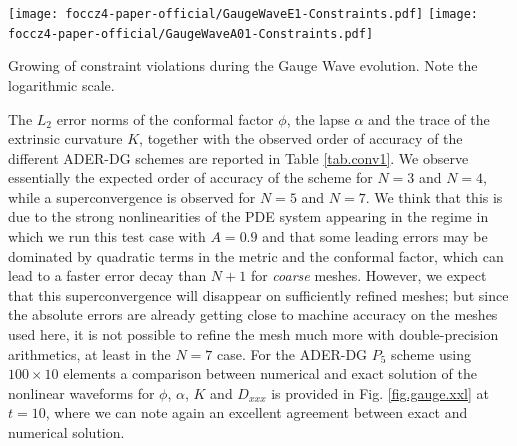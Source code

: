 \begin{marginfigure}[-6cm]
	\texttt{[image: foccz4-paper-official/GaugeWaveE1-Constraints.pdf]}
	\texttt{[image: foccz4-paper-official/GaugeWaveA01-Constraints.pdf]}
	\caption[
	GaugeWave: Constraint evolution 
	]{Growing of constraint violations during the Gauge Wave evolution.
		Note the logarithmic scale.}
	\label{fig.gaugewave2}
\end{marginfigure}

The $L_2$ error norms of the conformal factor $\phi$, the lapse $\alpha$ and
the trace of the extrinsic curvature $K$, together with the observed
order of accuracy of the different ADER-DG schemes are reported in Table
\ref{tab.conv1}. We observe essentially the expected order of accuracy of
the scheme for $N=3$ and $N=4$, while a superconvergence is observed for
$N=5$ and $N=7$. We think that this is due to the strong nonlinearities
of the PDE system appearing in the regime in which we run this test case
with $A=0.9$ and that some leading errors may be dominated by quadratic
terms in the metric and the conformal factor, which can lead to a faster
error decay than $N+1$ for \textit{coarse} meshes. However, we expect
that this superconvergence will disappear on sufficiently refined meshes;
but since the absolute errors are already getting close to machine
accuracy on the meshes used here, it is not possible to refine the mesh
much more with double-precision arithmetics, at least in the $N=7$ case.
For the ADER-DG $P_5$ scheme using $100 \times 10$ elements a comparison
between numerical and exact solution of the nonlinear waveforms for
$\phi$, $\alpha$, $K$ and $D_{xxx}$ is provided in Fig.
\ref{fig.gauge.xxl} at $t=10$, where we can note again an excellent
agreement between exact and numerical solution.

